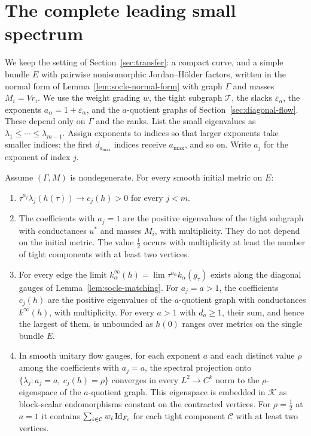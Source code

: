 \section{The complete leading small spectrum}\label{sec:complete-spectrum}

We keep the setting of Section~\ref{sec:transfer}: a compact curve, and a
simple bundle $E$ with pairwise nonisomorphic Jordan--H\"older factors,
written in the normal form of Lemma~\ref{lem:socle-normal-form} with graph
$\Gamma$ and masses $M_i=Vr_i$. We use the weight grading $w$, the tight subgraph
$\mathcal T$, the slacks $\varepsilon_\alpha$, the exponents
$a_\alpha=1+\varepsilon_\alpha$, and the $a$-quotient graphs of
Section~\ref{sec:diagonal-flow}. These depend only on $\Gamma$ and the ranks.
List the small eigenvalues as $\lambda_1\le\cdots\le\lambda_{m-1}$. Assign
exponents to indices so that larger exponents take smaller indices: the
first $d_{a_{\max}}$ indices receive $a_{\max}$, and so on. Write $a_j$ for
the exponent of index $j$.

\begin{theorem}\label{thm:complete-spectrum}
Assume $(\Gamma,M)$ is nondegenerate. For every smooth initial metric on $E$:
\begin{enumerate}
\item $\tau^{a_j}\lambda_j(h(\tau))\to c_j(h)>0$ for every $j<m$.
\item The coefficients with $a_j=1$ are the positive eigenvalues of the
 tight subgraph with conductances $u^*$ and masses $M_i$, with multiplicity.
 They do not depend on the initial metric. The value $\frac12$ occurs with
 multiplicity at least the number of tight components with at least two
 vertices.
\item For every edge the limit $k^\infty_\alpha(h)=\lim\tau^{a_\alpha}
 k_\alpha(g_\tau)$ exists along the diagonal gauges of
 Lemma~\ref{lem:socle-matching}. For $a_j=a>1$, the coefficients $c_j(h)$
 are the positive eigenvalues of the $a$-quotient graph with conductances
 $k^\infty(h)$, with multiplicity. For every $a>1$ with $d_a\ge1$, their sum,
 and hence the largest of them, is unbounded as $h(0)$ ranges over metrics
 on the single bundle $E$.
\item In smooth unitary flow gauges, for each exponent $a$ and each
 distinct value $\rho$ among the coefficients with $a_j=a$, the spectral
 projection onto $\{\lambda_j:a_j=a,\ c_j(h)=\rho\}$ converges in every
 $L^2\to C^k$ norm to the $\rho$-eigenspace of the $a$-quotient graph. This
 eigenspace is embedded in $\mathcal K$ as block-scalar endomorphisms
 constant on the contracted vertices. For $\rho=\frac12$ at $a=1$ it
 contains $\sum_{i\in\mathcal C}w_i\operatorname{Id}_{F_i}$ for each tight component $\mathcal C$ with at
 least two vertices.
\end{enumerate}
\end{theorem}

